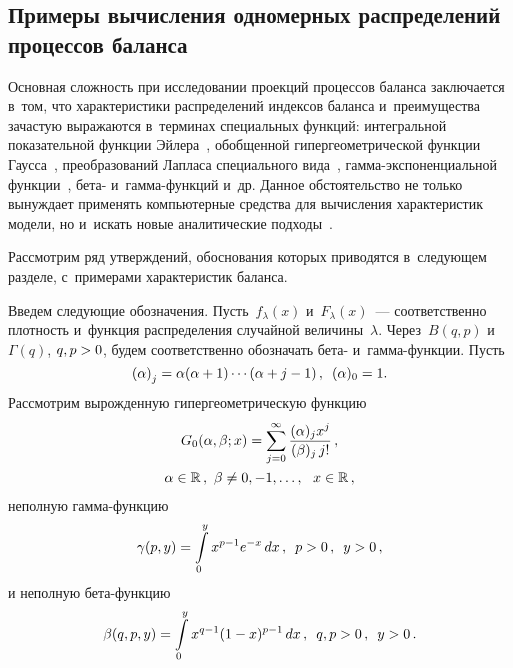 \begin{multicols}{2}
 \vspace*{-6pt}

\section{Примеры вычисления одномерных распределений процессов баланса}

 \vspace*{-2pt}

Основная сложность при исследовании проекций процессов баланса заключается 
в~том, что характеристики распределений индексов баланса и~преимущества 
зачастую выражаются в~терминах специальных функций: интегральной показательной 
функции Эйлера~\cite{KuShSh2009}, обобщенной гипергеометрической функции 
Гаусса~\cite{ZhaKuSh2014}, преобразований Лапласа специального вида~\cite{KuTi2016}, 
гам\-ма-экс\-по\-нен\-ци\-аль\-ной функции~\cite{KuTi2017}, бета- и~гам\-ма-функ\-ций и~др. 
Данное обстоятельство не только вынуждает применять компьютерные средства для 
вычисления характеристик модели, но и~искать новые аналитические
 подходы~\cite{KuTi2017}.

Рассмотрим ряд утверждений, обоснования которых приводятся в~следующем разделе, 
с~примерами характеристик баланса.

Введем следующие обозначения. Пусть~$f_\lambda(x)$ и~$F_\lambda(x)$~--- 
соответственно плот\-ность и~функция распределения случайной величины~$\lambda$. 
Через~$B(q,p)$ и~$\Gamma(q)$, $q,p\hm>0$, будем соответственно обозначать 
бета- и~гам\-ма-функ\-ции. Пусть
$$
\left(\alpha\right)_j=\alpha (\alpha+1)\cdots (\alpha+j-1)\,,\enskip
 (\alpha)_0=1.$$
Рассмотрим вырожденную гипергеометрическую функцию
\begin{multline*}
G_0(\alpha,\beta;x)=\sum\limits_{j=0}^\infty
\displaystyle\frac{\displaystyle (\alpha)_jx^j\mathstrut}{\displaystyle (\beta)_j \,j!\mathstrut}\,,\\
\alpha\in\mathbb{R}\,,\ \beta\neq 0, -1,\ldots,\ \ x\in\mathbb{R}\,,
\end{multline*}
неполную гамма-функцию
$$
\gamma(p,y)=\int\limits_0^y x^{p-1} e^{-x}\, dx\,,\enskip p>0\,,\enskip y>0\,,
$$
и неполную бета-функцию
$$
\beta(q,p,y)=\int\limits_0^y x^{q-1}(1-x)^{p-1} \,dx\,, \enskip q,p>0\,,\enskip y>0\,.
$$



\end{multicols}
